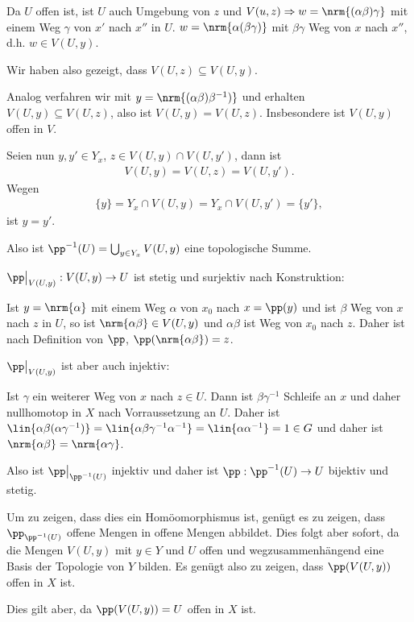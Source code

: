 Da $U$ offen ist, ist $U$ auch Umgebung von $z$ und $V(u,z)\Rightarrow
w=\nrm{(\alpha\beta)\gamma}$ mit einem Weg $\gamma$ von $x'$ nach $x''$ in $U$.
$w=\nrm{\alpha(\beta\gamma)}$ mit $\beta\gamma$ Weg von $x$ nach $x''$, d.h.
$w\in V(U,y)$.

Wir haben also gezeigt, dass $V(U,z)\subseteq V(U,y)$.

Analog verfahren wir mit $y=\nrm{(\alpha\beta)\beta^{-1})}$ und
erhalten $V(U,y)\subseteq V(U,z)$, also ist $V(U,y)=V(U,z)$. Insbesondere ist
$V(U,y)$ offen in $V$.

Seien nun $y,y'\in Y_x$, $z\in V(U,y)\cap V(U,y')$, dann ist
\begin{align*}
V(U,y) = V(U,z) = V(U,y').
\end{align*}
Wegen
\begin{align*}
\{y\} = Y_x\cap V(U,y) = Y_x\cap V(U,y') = \{y'\},
\end{align*}
ist $y=y'$.

Also ist $\pp^{-1}(U) = \bigcup_{y\in Y_x} V(U,y)$ eine topologische Summe.

$\pp\big|_{V(U,y)} : V(U,y)\to U$ ist stetig und surjektiv nach Konstruktion:

Ist $y=\nrm{\alpha}$ mit einem Weg $\alpha$ von $x_0$ nach $x=\pp(y)$ und ist
$\beta$ Weg von $x$ nach $z$ in $U$, so ist $\nrm{\alpha\beta}\in V(U,y)$ und
$\alpha\beta$ ist Weg von $x_0$ nach $z$. Daher ist nach Definition von $\pp$,
$\pp(\nrm{\alpha\beta})=z$.

$\pp\big|_{V(U,y)}$ ist aber auch injektiv:

Ist $\gamma$ ein weiterer Weg von $x$ nach $z\in U$. Dann ist
$\beta\gamma^{-1}$ Schleife an $x$ und daher nullhomotop in $X$ nach
Vorraussetzung an $U$. Daher ist $\lin{\alpha\beta(\alpha\gamma^{-1})} =
\lin{\alpha\beta\gamma^{-1}\alpha^{-1}} = \lin{\alpha\alpha^{-1}} = 1\in G$ und
daher ist $\nrm{\alpha\beta} = \nrm{\alpha\gamma}$.

Also ist $\pp\big|_{\pp^{-1}(U)}$ injektiv und daher ist $\pp: \pp^{-1}(U)\to
U$ bijektiv und stetig.

Um zu zeigen, dass dies ein Homöomorphismus ist, genügt es zu zeigen, dass
$\pp_{\pp^{-1}(U)}$ offene Mengen in offene Mengen abbildet. Dies folgt aber
sofort, da die Mengen $V(U,y)$ mit $y\in Y$ und $U$ offen und
wegzusammenhängend eine Basis der Topologie von $Y$ bilden. Es genügt also zu
zeigen, dass $\pp(V(U,y))$ offen in $X$ ist.

Dies gilt aber, da $\pp(V(U,y)) = U$ offen in $X$ ist.

